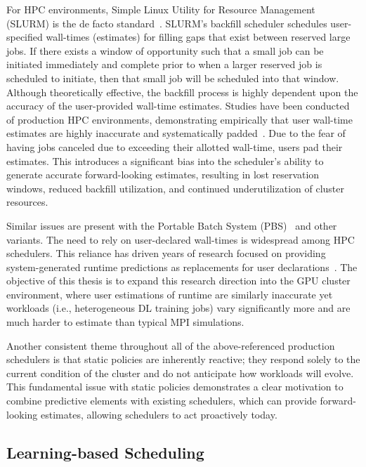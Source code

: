 For HPC environments, Simple Linux Utility for Resource Management (SLURM) is the de facto standard~\cite{yoo2003slurm}. SLURM's backfill scheduler schedules user-specified wall-times (estimates) for filling gaps that exist between reserved large jobs. If there exists a window of opportunity such that a small job can be initiated immediately and complete prior to when a larger reserved job is scheduled to initiate, then that small job will be scheduled into that window. Although theoretically effective, the backfill process is highly dependent upon the accuracy of the user-provided wall-time estimates. Studies have been conducted of production HPC environments, demonstrating empirically that user wall-time estimates are highly inaccurate and systematically padded~\cite{tsafrir2007backfill,mualem2001backfilling,lee2004estimates}. Due to the fear of having jobs canceled due to exceeding their allotted wall-time, users pad their estimates. This introduces a significant bias into the scheduler's ability to generate accurate forward-looking estimates, resulting in lost reservation windows, reduced backfill utilization, and continued underutilization of cluster resources.

Similar issues are present with the Portable Batch System (PBS)~\cite{henderson1995job} and other variants. The need to rely on user-declared wall-times is widespread among HPC schedulers. This reliance has driven years of research focused on providing system-generated runtime predictions as replacements for user declarations~\cite{tsafrir2007backfill}. The objective of this thesis is to expand this research direction into the GPU cluster environment, where user estimations of runtime are similarly inaccurate yet workloads (i.e., heterogeneous DL training jobs) vary significantly more and are much harder to estimate than typical MPI simulations.

\clearpage
Another consistent theme throughout all of the above-referenced production schedulers is that static policies are inherently reactive; they respond solely to the current condition of the cluster and do not anticipate how workloads will evolve. This fundamental issue with static policies demonstrates a clear motivation to combine predictive elements with existing schedulers, which can provide forward-looking estimates, allowing schedulers to act proactively today.

\subsection{Learning-based Scheduling}

